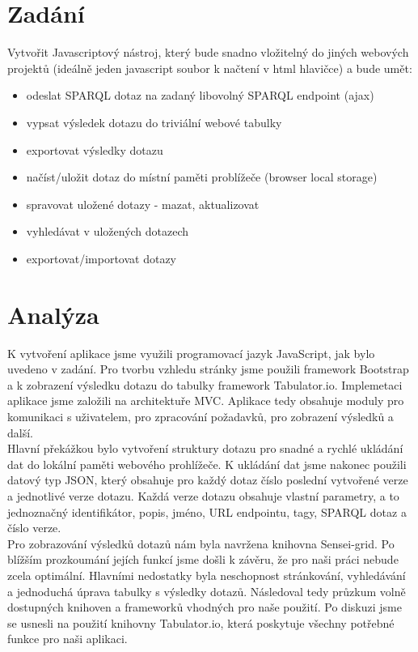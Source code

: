 \documentclass[
12pt,
a4paper,
pdftex,
czech,
titlepage
]{report}
\begin{document}
\chapter{Zadání}
Vytvořit Javascriptový nástroj, který bude snadno vložitelný do jiných webových projektů (ideálně jeden javascript soubor k načtení v html hlavičce) a bude umět:
\begin{itemize}
	\item odeslat SPARQL dotaz na zadaný libovolný SPARQL endpoint (ajax)
	\item vypsat výsledek dotazu do triviální webové tabulky
	\item exportovat výsledky dotazu
	\item načíst/uložit dotaz do místní paměti problížeče (browser local storage)
	\item spravovat uložené dotazy - mazat, aktualizovat
	\item vyhledávat v uložených dotazech
	\item exportovat/importovat dotazy
\end{itemize}

\chapter{Analýza}
K vytvoření aplikace jsme využili programovací jazyk JavaScript, jak bylo uvedeno v zadání. Pro tvorbu vzhledu stránky jsme použili framework Bootstrap a k zobrazení výsledku dotazu do tabulky framework Tabulator.io. Implemetaci aplikace jsme založili na architektuře MVC. Aplikace tedy obsahuje moduly pro komunikaci s uživatelem, pro zpracování požadavků, pro zobrazení výsledků a další.\\Hlavní překážkou bylo vytvoření struktury dotazu pro snadné a rychlé ukládání dat do lokální paměti webového prohlížeče. K ukládání dat jsme nakonec použili datový typ JSON, který obsahuje pro každý dotaz číslo poslední vytvořené verze a jednotlivé verze dotazu. Každá verze dotazu obsahuje vlastní parametry, a to jednoznačný identifikátor, popis, jméno, URL endpointu, tagy, SPARQL dotaz a číslo verze.\\Pro zobrazování výsledků dotazů nám byla navržena knihovna Sensei-grid. Po blížším prozkoumání jejích funkcí jsme došli k závěru, že pro naši práci nebude zcela optimální. Hlavními nedostatky byla neschopnost stránkování, vyhledávání a jednoduchá úprava tabulky s výsledky dotazů. Následoval tedy průzkum volně dostupných knihoven a frameworků vhodných pro naše použití. Po diskuzi jsme se usnesli na použití knihovny Tabulator.io, která poskytuje všechny potřebné funkce pro naši aplikaci.
\end{document}
